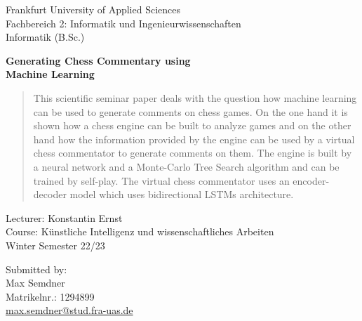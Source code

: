 \begin{titlepage}
\begin{flushleft}
Frankfurt University of Applied Sciences\\
Fachbereich 2: Informatik und Ingenieurwissenschaften\\
Informatik (B.Sc.)\\
\end{flushleft}

\vspace{3.5cm}

\begin{center}
\Large
\textbf{Generating Chess Commentary using\\Machine Learning}\\
\end{center}

\begin{abstract}
This scientific seminar paper deals with the question how machine learning can be used to generate comments on chess games. On the one hand it is shown how a chess engine can be built to analyze games and on the other hand how the information provided by the engine can be used by a virtual chess commentator to generate comments on them. The engine is built by a neural network and a Monte-Carlo Tree Search algorithm and can be trained by self-play. The virtual chess commentator uses an encoder-decoder model which uses bidirectional LSTMs architecture.
\end{abstract}

\vspace{6cm}
	
\begin{flushright}
Lecturer: Konstantin Ernst\\
Course: Künstliche Intelligenz und wissenschaftliches Arbeiten\\
Winter Semester 22/23\\
\end{flushright}

\vspace{2cm}

\begin{flushleft}
Submitted by:\\
Max Semdner\\
Matrikelnr.: 1294899\\
\href{mailto: max.semdner@stud.fra-uas.de}{max.semdner@stud.fra-uas.de}\\
\end{flushleft}

\end{titlepage}